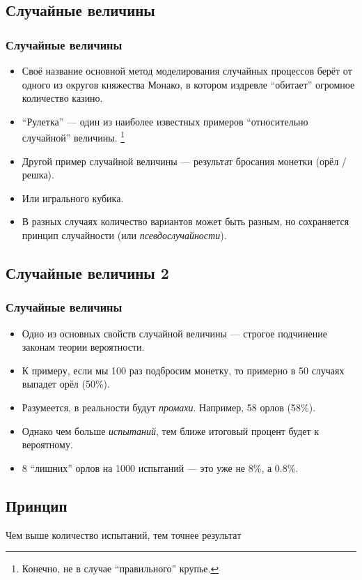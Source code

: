 \documentclass[compress,red]{beamer}
\begin{document}
\subsection{Случайные величины}
\begin{frame}[fragile]
  \frametitle{Случайные величины}
  \begin{itemize}
    \item Своё название основной метод моделирования случайных процессов берёт от одного из округов княжества Монако, в котором издревле ``обитает'' огромное количество казино.
    \item ``Рулетка'' --- один из наиболее известных примеров ``относительно случайной'' величины. \footnote{Конечно, не в случае ``правильного'' крупье.}
    \item Другой пример случайной величины --- результат бросания монетки (орёл / решка).
    \item Или игрального кубика.
    \item В разных случаях количество вариантов может быть разным, но сохраняется принцип случайности (или \emph{псевдослучайности}).
  \end{itemize}
\end{frame}

\subsection{Случайные величины 2}
\begin{frame}[fragile]
  \frametitle{Случайные величины}
  \begin{itemize}
    \item Одно из основных свойств случайной величины --- строгое подчинение законам теории вероятности.
    \item К примеру, если мы 100 раз подбросим монетку, то примерно в 50 случаях выпадет орёл (50\%).
    \item Разумеется, в реальности будут \emph{промахи}. Например, 58 орлов (58\%).
    \item Однако чем больше \emph{испытаний}, тем ближе итоговый процент будет к вероятному.
    \item 8 ``лишних'' орлов на 1000 испытаний --- это уже не 8\%, а 0.8\%.
  \end{itemize}
\end{frame}

\subsection{Принцип}
\begin{frame}
  \begin{center}
    \Large{Чем выше количество испытаний, тем точнее результат}
  \end{center}
\end{frame}
\end{document}
